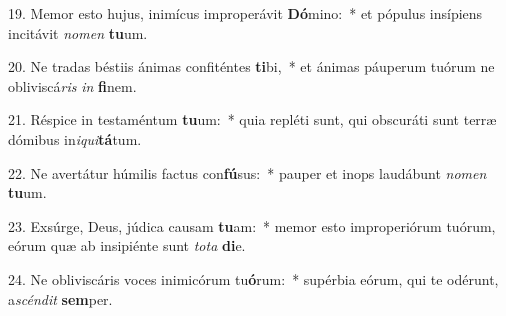 19. Memor esto hujus, inimícus improperávit \textbf{Dó}mino:~*  et pópulus insípiens incitávit \textit{no}\textit{men} \textbf{tu}um.\

20. Ne tradas béstiis ánimas confiténtes \textbf{ti}bi,~*  et ánimas páuperum tuórum ne obliviscá\textit{ris} \textit{in} \textbf{fi}nem.\

21. Réspice in testaméntum \textbf{tu}um:~*  quia repléti sunt, qui obscuráti sunt terræ dómibus in\textit{i}\textit{qui}\textbf{tá}tum.\

22. Ne avertátur húmilis factus con\textbf{fú}sus:~*  pauper et inops laudábunt \textit{no}\textit{men} \textbf{tu}um.\

23. Exsúrge, Deus, júdica causam \textbf{tu}am:~*  memor esto improperiórum tuórum, eórum quæ ab insipiénte sunt \textit{to}\textit{ta} \textbf{di}e.\

24. Ne obliviscáris voces inimicórum tu\textbf{ó}rum:~*  supérbia eórum, qui te odérunt, a\textit{scén}\textit{dit} \textbf{sem}per.\

